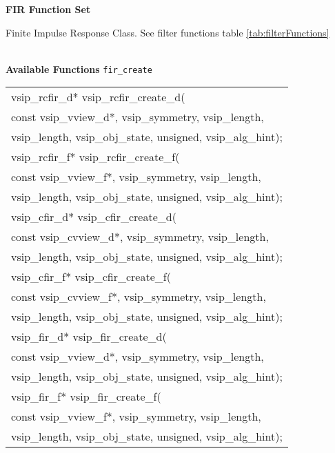 \clearpage
{\large \textbf{\hypertarget{firFunc}{FIR Function Set}}}\vspace{.2cm}\\
\hspace*{.3cm}
\parbox{0.85\textwidth}{Finite Impulse Response Class. See filter functions table \ref{tab:filterFunctions}}
\\\cvsiplh 
\newline \hspace*{.8cm} \vspace*{.1cm} \textbf{Available Functions }
\newline \hspace*{.8cm} \vspace*{.1cm} \texttt{fir\_create}
\newline \hspace*{1.1cm} {
\ttfamily
\begin{tabular}[H]{l}
vsip\_rcfir\_d* vsip\_rcfir\_create\_d(\\*\hspace{.7cm}const vsip\_vview\_d*, vsip\_symmetry, vsip\_length,\\*\hspace{.7cm}vsip\_length, vsip\_obj\_state, unsigned, vsip\_alg\_hint);\\
vsip\_rcfir\_f* vsip\_rcfir\_create\_f(\\*\hspace{.7cm}const vsip\_vview\_f*, vsip\_symmetry, vsip\_length,\\*\hspace{.7cm}vsip\_length, vsip\_obj\_state, unsigned, vsip\_alg\_hint);\\
vsip\_cfir\_d* vsip\_cfir\_create\_d(\\*\hspace{.7cm}const vsip\_cvview\_d*, vsip\_symmetry, vsip\_length,\\*\hspace{.7cm}vsip\_length, vsip\_obj\_state, unsigned, vsip\_alg\_hint);\\
vsip\_cfir\_f* vsip\_cfir\_create\_f(\\*\hspace{.7cm}const vsip\_cvview\_f*, vsip\_symmetry, vsip\_length,\\*\hspace{.7cm}vsip\_length, vsip\_obj\_state, unsigned, vsip\_alg\_hint);\\
vsip\_fir\_d* vsip\_fir\_create\_d(\\*\hspace{.7cm}const vsip\_vview\_d*, vsip\_symmetry, vsip\_length,\\*\hspace{.7cm}vsip\_length, vsip\_obj\_state, unsigned, vsip\_alg\_hint);\\
vsip\_fir\_f* vsip\_fir\_create\_f(\\*\hspace{.7cm}const vsip\_vview\_f*, vsip\_symmetry, vsip\_length,\\*\hspace{.7cm}vsip\_length, vsip\_obj\_state, unsigned, vsip\_alg\_hint);\\
\end{tabular}
}
